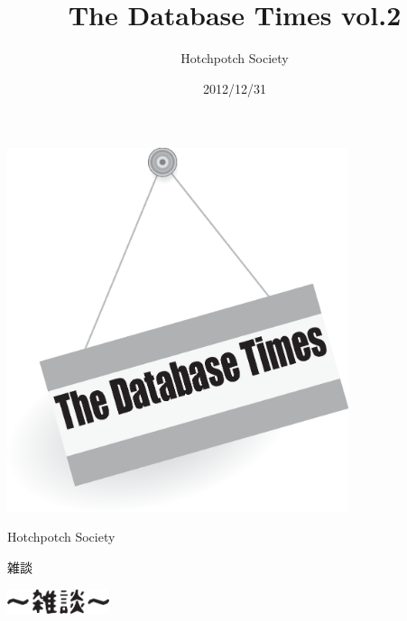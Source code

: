 \documentclass[b5paper,papersize,tombow,11pt]{jsbook}
\title{The Database Times vol.2}
\date{2012/12/31}
\author{Hotchpotch Society}
\begin{document}
\thispagestyle{empty}

\frontmatter

\begin{center}
 \includegraphics[width=10cm]{images/title.eps}
 \par\vspace*{50mm}
 \noindent Hotchpotch Society
\end{center}



\setcounter{tocdepth}{0} %
\tableofcontents

\mainmatter

\pagestyle{fancy}







\small

\normalsize

\newpage

{\protect 雑談}

\begin{center}
 \includegraphics[width=3cm]{images/zatsudan.eps}
\end{center}

\footnotesize


\end{document}
